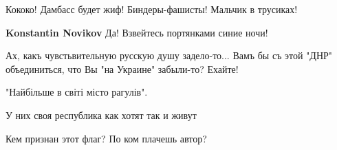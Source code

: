 \begin{itemize}
\begin{itemize}
\end{itemize}

 
Кококо! Дамбасс будет жиф! Биндеры-фашисты! Мальчик в трусиках!

\begin{itemize}
 
\textbf{Konstantin Novikov} Да! Взвейтесь портянками синие ночи!
\end{itemize}

 
Ах, какъ чувстьвительную русскую душу задело-то... Вамъ бы съ этой "ДНР" объединиться, что Вы "на Украине" забыли-то? Ехайте!

 
"Найбільше в світі місто рагулів".

 
У них своя республика как хотят так и живут

 
Кем признан этот флаг? По ком плачешь автор?

\end{itemize}

